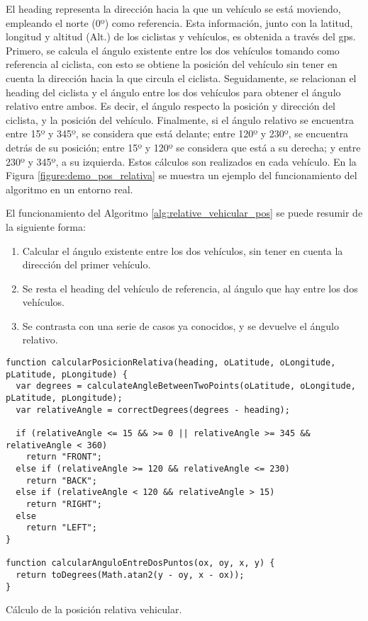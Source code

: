 El heading representa la dirección hacia la que un vehículo se está moviendo,
empleando el norte (0º) como referencia. Esta información, junto con la
latitud, longitud y altitud (Alt.) de los ciclistas y vehículos, es obtenida a
través del \gls{gps}. Primero, se calcula el ángulo existente entre los dos
vehículos tomando como referencia al ciclista, con esto se obtiene la posición
del vehículo sin tener en cuenta la dirección hacia la que circula el ciclista.
Seguidamente, se relacionan el heading del ciclista y el ángulo entre los dos
vehículos para obtener el ángulo relativo entre ambos. Es decir, el ángulo
respecto la posición y dirección del ciclista, y la posición del vehículo.
Finalmente, si el ángulo relativo se encuentra entre 15º y 345º, se considera
que está delante; entre 120º y 230º, se encuentra detrás de su posición; entre
15º y 120º se considera que está a su derecha; y entre 230º y 345º, a su
izquierda. Estos cálculos son realizados en cada vehículo. En la Figura
\ref{figure:demo_pos_relativa} se muestra un ejemplo del funcionamiento del
algoritmo en un entorno real.

El funcionamiento del Algoritmo \ref{alg:relative_vehicular_pos} se puede
resumir de la siguiente forma:
\begin{enumerate}
	\item Calcular el ángulo existente entre los dos vehículos, sin tener en
	cuenta la dirección del primer vehículo.

	\item Se resta el heading del vehículo de referencia, al ángulo que hay entre
	los dos vehículos.

	\item Se contrasta con una serie de casos ya conocidos, y se devuelve el
	ángulo relativo.
\end{enumerate}

\begin{listing}
	\begin{minipage}{.4\textwidth}
		\begin{verbatim}
function calcularPosicionRelativa(heading, oLatitude, oLongitude, pLatitude, pLongitude) {
  var degrees = calculateAngleBetweenTwoPoints(oLatitude, oLongitude, pLatitude, pLongitude);
  var relativeAngle = correctDegrees(degrees - heading);

  if (relativeAngle <= 15 && >= 0 || relativeAngle >= 345 && relativeAngle < 360)
    return "FRONT";
  else if (relativeAngle >= 120 && relativeAngle <= 230)
    return "BACK";
  else if (relativeAngle < 120 && relativeAngle > 15)
    return "RIGHT";
  else
    return "LEFT";
}

function calcularAnguloEntreDosPuntos(ox, oy, x, y) {
  return toDegrees(Math.atan2(y - oy, x - ox));
}
\end{verbatim}
\end{minipage}
\caption{Cálculo de la posición relativa vehicular.}
\label{alg:relative_vehicular_pos}
\end{listing}

